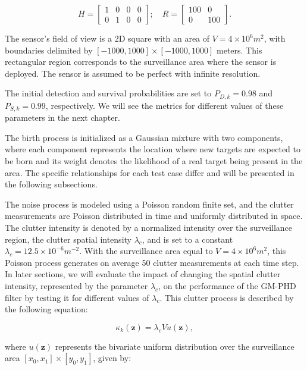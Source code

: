 \begin{equation}
    H =
    \begin{bmatrix}
        1 & 0 &0 & 0 \\
        0 & 1 &0 & 0
    \end{bmatrix};
    \quad
    R = \begin{bmatrix}
        100 & 0   \\
        0   & 100
    \end{bmatrix}.
\end{equation}

The sensor's field of view is a 2D square with an area of $V = 4 \times 10^6 m^2$, with boundaries delimited by $[-1000, 1000] \times [-1000, 1000]$ meters. This rectangular region corresponds to the surveillance area where the sensor is deployed. The sensor is assumed to be perfect with infinite resolution.

The initial detection and survival probabilities are set to $P_{D,k} = 0.98$ and $P_{S,k} = 0.99$, respectively. We will see the metrics for different values of these parameters in the next chapter.

The birth process is initialized as a Gaussian mixture with two components, where each component represents the location where new targets are expected to be born and its weight denotes the likelihood of a real target being present in the area. The specific relationships for each test case differ and will be presented in the following subsections.

The noise process is modeled using a Poisson random finite set, and the clutter measurements are Poisson distributed in time and uniformly distributed in space. The clutter intensity is denoted by a normalized intensity over the surveillance region, the clutter spatial intensity $\lambda_c$, and is set to a constant $\lambda_c = 12.5 \times 10^{-6} m^{-2}$. With the surveillance area equal to $V = 4 \times 10^6 m^2$, this Poisson process generates on average 50 clutter measurements at each time step. In later sections, we will evaluate the impact of changing the spatial clutter intensity, represented by the parameter $\lambda_c$, on the performance of the GM-PHD filter by testing it for different values of $\lambda_c$. This clutter process is described by the following equation:

\begin{equation}
\kappa_k(\mathbf{z}) = \lambda_c V u(\mathbf{z}),
\end{equation}

\noindent where $u(\mathbf{z})$ represents the bivariate uniform distribution over the surveillance area $[x_0, x_1] \times [y_0, y_1]$, given by:

